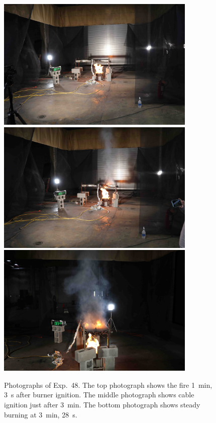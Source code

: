 \begin{figure}[p]
\centering
\includegraphics[height=2.50in]{../FIGURES/Test_48_1_min_3_s} \\ \vspace{0.1in}
\includegraphics[height=2.50in]{../FIGURES/Test_48_3_min_11_s} \\ \vspace{0.1in}
\includegraphics[height=2.50in]{../FIGURES/Test_48_3_min_28_s}
\caption[Photographs of Exp.~48]{Photographs of Exp.~48. The top photograph shows the fire 1~min, 3~s after burner ignition. The middle photograph shows cable ignition just after 3~min. The bottom photograph shows steady burning at 3~min, 28~s.}
\label{fig:Test_48_photos}
\end{figure}


